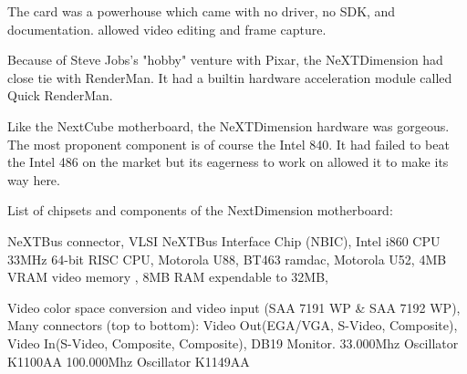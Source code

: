 \par
\par
The card was a powerhouse which came with no driver, no SDK, and documentation.  allowed video editing and frame capture.\\
\par
{}
\par
Because of Steve Jobs's "hobby" venture with Pixar, the NeXTDimension had close tie with RenderMan. It had a builtin hardware acceleration module called Quick RenderMan.\\
\par
\par

\par
Like the NextCube motherboard, the NeXTDimension hardware was gorgeous. The most proponent component is of course the Intel 840. It had failed to beat the Intel 486 on the market but its eagerness to work on \doom allowed it to make its way here.\\
\par
{}
\par
List of chipsets and components of the NextDimension motherboard:\\
\par 
{} NeXTBus connector,
 VLSI NeXTBus Interface Chip (NBIC),
 Intel i860 CPU 33MHz 64-bit RISC CPU,
 Motorola U88,
 BT463 ramdac,
 Motorola U52,
 4MB VRAM video memory ,
 8MB RAM expendable to 32MB,

 Video color space conversion and video input (SAA 7191 WP \& SAA 7192 WP), 
 Many connectors (top to bottom): Video Out(EGA/VGA, S-Video, Composite), Video In(S-Video, Composite, Composite), DB19 Monitor.
 33.000Mhz Oscillator K1100AA
 100.000Mhz Oscillator K1149AA
\par

